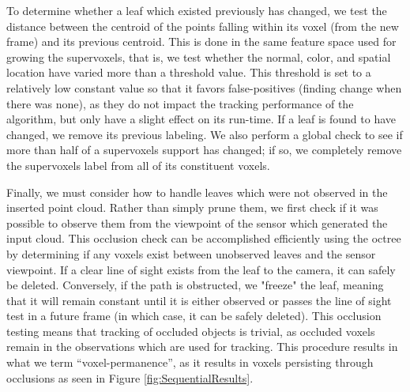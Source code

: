 To determine whether a leaf which existed previously has changed, we test the distance between the centroid of the points falling within its voxel (from the new frame) and its previous centroid. This is done in the same feature space used for growing the supervoxels, that is, we test whether the normal, color, and spatial location have varied more than a threshold value. This threshold is set to a relatively low constant value so that it favors false-positives (finding change when there was none), as they do not impact the tracking performance of the algorithm, but only have a slight effect on its run-time.  If a leaf is found to have changed, we remove its previous labeling. We also perform a global check to see if more than half of a supervoxels support has changed; if so, we completely remove the supervoxels label from all of its constituent voxels. 

Finally, we must consider how to handle leaves which were not observed in the inserted point cloud. Rather than simply prune them, we first check if it was possible to observe them from the viewpoint of the sensor which generated the input cloud. This occlusion check can be accomplished efficiently using the octree by determining if any voxels exist between unobserved leaves and the sensor viewpoint. If a clear line of sight exists from the leaf to the camera, it can safely be deleted. Conversely, if the path is obstructed, we "freeze" the leaf, meaning that it will remain constant until it is either observed or passes the line of sight test in a future frame (in which case, it can be safely deleted). This occlusion testing means that tracking of occluded objects is trivial, as occluded voxels remain in the observations which are used for tracking. This procedure results in what we term ``voxel-permanence'', as it results in voxels persisting through occlusions as seen in Figure \ref{fig:SequentialResults}. 

